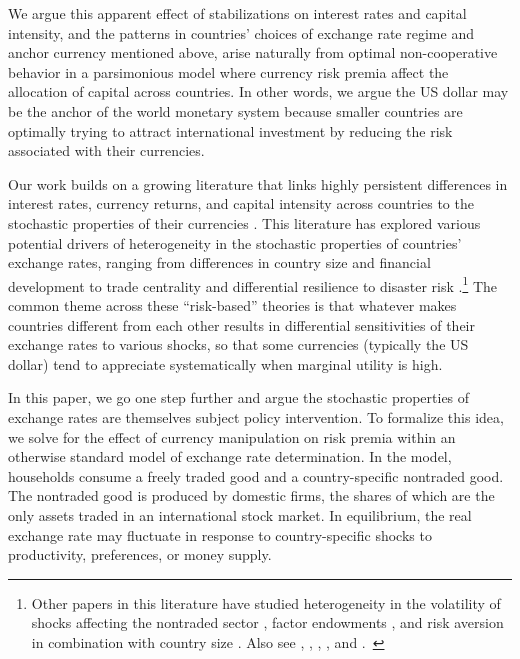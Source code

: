 \documentclass[12pt,letter]{article}
\theoremstyle{break} \theorembodyfont{\normalfont\itshape}
\theoremstyle{break}
\theoremstyle{break} \theorembodyfont{\normalfont\itshape}
\theoremstyle{break} \theorembodyfont{\normalfont\itshape}
\begin{document}
  

We argue this apparent effect of stabilizations on interest rates and
capital intensity, and the patterns in countries' choices of exchange
rate regime and anchor currency mentioned above, arise naturally from
optimal non-cooperative behavior in a parsimonious model where
currency risk premia affect the allocation of capital across
countries. In other words, we argue the US dollar may be the anchor of
the world monetary system because smaller countries are optimally
trying to attract international investment by reducing the risk
associated with their currencies.


Our work builds on a growing literature that links highly persistent
differences in interest rates, currency returns, and capital intensity
across countries to the stochastic properties of their currencies
\citep*{LustigVerdelhan2007,Lustigetal2011,HassanMano2015,HassanMertensZhang2015}.
This literature has explored various potential drivers of
heterogeneity in the stochastic properties of countries' exchange
rates, ranging from differences in country size
\citep*{Martin2012,Hassan2013} and financial development
\citep*{Maggiori2013} to trade centrality \citep{Richmond2015} and
differential resilience to disaster risk
\citep{FarhiGabaix2015,ColacitoCroceGavazzoniReady2014}.\footnote{
  Other papers in this literature have studied heterogeneity in the
  volatility of shocks affecting the nontraded sector
  \citep{Tran2013}, factor endowments
  \citep*{Readyetal2013,Powers2015}, and risk aversion in combination
  with country size \citep*{GourinchasReyGovillot2010}. Also see
  \citet*{GourinchasRey2007}, \citet*{CampbellMedeirosViceira2010},
  \citet{Menkhoffetal2012a}, \citet*{DavidHenriksenSimonovska2014},
  and \citet*{Verdelhan2015}. \,} The common theme across these
``risk-based'' theories is that whatever makes countries different
from each other results in differential sensitivities of their
exchange rates to various shocks, so that some currencies (typically
the US dollar) tend to appreciate systematically when marginal utility
is high.

In this paper, we go one step further and argue the stochastic
properties of exchange rates are themselves subject policy
intervention. To formalize this idea, we solve for the effect of
currency manipulation on risk premia within an otherwise standard
model of exchange rate determination. In the model, households consume
a freely traded good and a country-specific nontraded good. The
nontraded good is produced by domestic firms, the shares of which are
the only assets traded in an international stock market. In
equilibrium, the real exchange rate may fluctuate in response to
country-specific shocks to productivity, preferences, or money supply.
\end{document}
